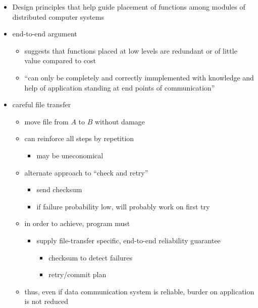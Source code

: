 \begin{itemize}
    \item Design principles that help guide placement of functions among modules
    of distributed computer systems
    \item end-to-end argument
    \begin{itemize}
        \item suggests that functions placed at low levels are redundant or of
        little value compared to cost
        \item ``can only be completely and correctly immplemented with knowledge
        and help of application standing at end points of communication''
    \end{itemize}
    \item careful file transfer
    \begin{itemize}
        \item move file from $A$ to $B$ without damage
        \item can reinforce all steps by repetition
        \begin{itemize}
            \item may be uneconomical
        \end{itemize}
        \item alternate approach to ``check and retry''
        \begin{itemize}
            \item send checksum
            \item if failure probability low, will probably work on first try
        \end{itemize}
        \item in order to achieve, program must
        \begin{itemize}
            \item supply file-transfer specific, end-to-end reliability guarantee
            \begin{itemize}
                \item checksum to detect failures
                \item retry/commit plan
            \end{itemize}
        \end{itemize}
        \item thus, even if data communication system is reliable, burder on
        application is not reduced

\end{itemize}
\end{itemize}
